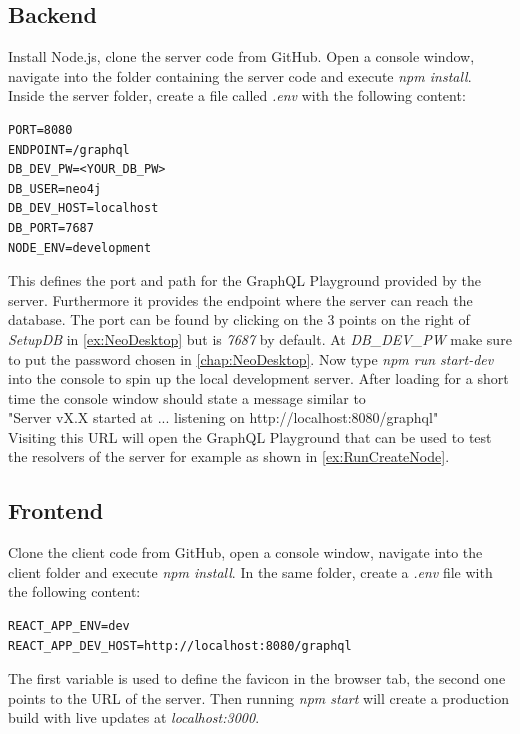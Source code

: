 \subsection{Backend}
Install Node.js, clone the server \cite{GitServer} code from GitHub. Open a console window, navigate into the folder containing the server code and execute \emph{npm install}. Inside the server folder, create a file called \emph{.env} with the following content:
\lstset{language=Docker}
\begin{lstlisting}[caption={Environment Variables for the Server}]
PORT=8080
ENDPOINT=/graphql
DB_DEV_PW=<YOUR_DB_PW>
DB_USER=neo4j
DB_DEV_HOST=localhost
DB_PORT=7687
NODE_ENV=development
\end{lstlisting}
This defines the port and path for the GraphQL Playground provided by the server. Furthermore it provides the endpoint where the server can reach the database. The port can be found by clicking on the 3 points on the right of \emph{SetupDB} in \autoref{ex:NeoDesktop} but is \emph{7687} by default. At \emph{DB\_DEV\_PW} make sure to put the password chosen in \autoref{chap:NeoDesktop}.
Now type \emph{npm run start-dev} into the console to spin up the local development server. After loading for a short time the console window should state a message similar to \\
"Server vX.X started at ... listening on http://localhost:8080/graphql" \\
Visiting this URL will open the GraphQL Playground that can be used to test the resolvers of the server for example as shown in \autoref{ex:RunCreateNode}.

\subsection{Frontend}
Clone the client \cite{GitClient} code from GitHub, open a console window, navigate into the client folder and execute \emph{npm install}. In the same folder, create a \emph{.env} file with the following content:
\begin{lstlisting}[caption={Environment Variables for the Frontend}]
REACT_APP_ENV=dev
REACT_APP_DEV_HOST=http://localhost:8080/graphql
\end{lstlisting}
The first variable is used to define the favicon in the browser tab, the second one points to the URL of the server. Then running \emph{npm start} will create a production build with live updates at \emph{localhost:3000}.

